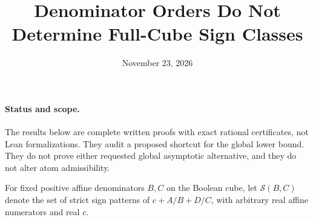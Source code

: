 \documentclass[11pt]{article}
\title{Denominator Orders Do Not Determine Full-Cube Sign Classes}
\author{}
\date{November 23, 2026}
\begin{document}
\maketitle

\paragraph{Status and scope.}
The results below are complete written proofs with exact rational
certificates, not Lean formalizations. They audit a proposed shortcut
for the global lower bound. They do not prove either requested global
asymptotic alternative, and they do not alter atom admissibility.

For fixed positive affine denominators $B,C$ on the Boolean cube,
let $\mathcal S(B,C)$ denote the set of strict sign patterns of
$c+A/B+D/C$, with arbitrary real affine numerators and real $c$.
\end{document}
